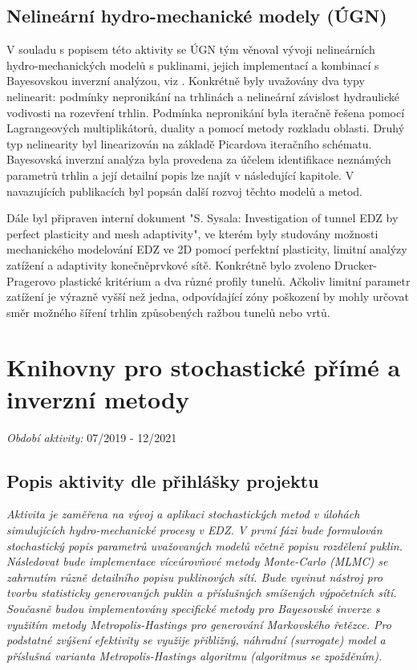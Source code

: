\documentclass[11pt,a4paper]{article}
\begin{document}
\begin{onehalfspacing}
\subsection{Nelineární hydro-mechanické modely (ÚGN)}
V souladu s popisem této aktivity se ÚGN tým věnoval vývoji nelineárních hydro-mechanických modelů s puklinami, jejich implementací a kombinací s Bayesovskou inverzní analýzou, viz \cite{blaheta2020bayesian}. Konkrétně byly uvažovány dva typy nelinearit: podmínky nepronikání na trhlinách a nelineární závislost hydraulické vodivosti na rozevření trhlin. Podmínka nepronikání byla iteračně řešena pomocí Lagrangeových multiplikátorů, duality a pomocí metody rozkladu oblasti. Druhý typ nelinearity byl linearizován na základě Picardova iteračního schématu. Bayesovská inverzní analýza byla provedena za účelem identifikace neznámých parametrů trhlin a její detailní popis lze najít v následující kapitole. V navazujících publikacích \cite{berevs2021numerical, BBDHH2020} byl popsán další rozvoj těchto modelů a metod.

Dále byl připraven interní dokument "S. Sysala: Investigation of tunnel EDZ by perfect plasticity and mesh
adaptivity", ve kterém byly studovány možnosti mechanického modelování EDZ ve 2D pomocí perfektní plasticity, limitní analýzy zatížení a adaptivity konečněprvkové sítě. Konkrétně bylo zvoleno Drucker-Pragerovo plastické kritérium a dva různé profily tunelů. Ačkoliv limitní parametr zatížení je výrazně vyšší než jedna, odpovídající zóny poškození by mohly určovat směr možného šíření trhlin způsobených ražbou tunelů nebo vrtů.

\section{Knihovny pro stochastické přímé a inverzní metody}
\label{sec:stochastic}
{\it Období aktivity:}  07/2019 - 12/2021

\subsection{Popis aktivity dle přihlášky projektu}
{\it 
Aktivita je zaměřena na vývoj a aplikaci stochastických metod v úlohách simulujících hydro-mechanické procesy v EDZ. V první fázi
bude formulován stochastický popis parametrů uvažovaných modelů včetně popisu rozdělení puklin. Následovat bude implementace
víceúrovňové metody Monte-Carlo (MLMC) se zahrnutím různě detailního popisu puklinových sítí. Bude vyvinut nástroj pro tvorbu
statisticky generovaných puklin a příslušných smíšených výpočetních sítí. Současně budou implementovány specifické metody pro
Bayesovské inverze s využitím metody Metropolis-Hastings pro generování Markovského řetězce. Pro podstatné zvýšení efektivity se
využije přibližný, náhradní (surrogate) model a příslušná varianta Metropolis-Hastings algoritmu (algoritmus se zpožděním).}



\end{onehalfspacing}
\end{document}
